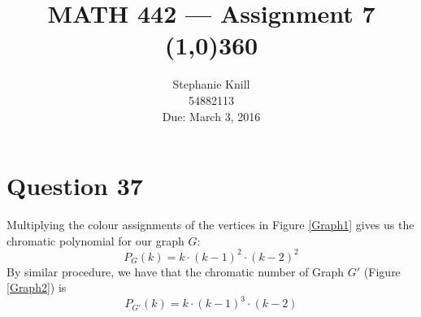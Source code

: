 \documentclass[11pt, oneside]{article}   	%
\begin{document}
\title{MATH 442 --- Assignment 7 \\
\line(1,0){360} \\              %
}
\author{
Stephanie Knill \\
54882113 \\
Due: March 3, 2016}

\date{}                   %
\maketitle




\section*{Question 37}

Multiplying the colour assignments of the vertices in Figure \ref{Graph1} gives us the chromatic polynomial for our graph $G$:
	$$P_G(k) = k \cdot (k-1)^2\cdot (k-2)^2$$
By similar procedure, we have that the chromatic number of Graph $G'$ (Figure \ref{Graph2}) is
	$$P_{G'}(k) = k \cdot (k-1)^3 \cdot (k-2)$$
	
\end{document}
